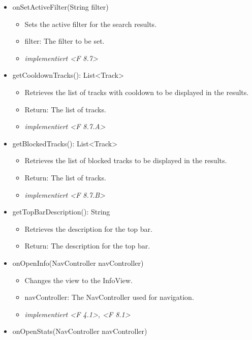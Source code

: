 \documentclass[oneside, ngerman]{sdqtechreport}
\begin{document}
\begin{itemize}
\begin{itemize}
        \end{itemize}
    \item onSetActiveFilter(String filter)
        \begin{itemize}
            \item Sets the active filter for the search results.
            \item filter: The filter to be set.
            \item \textit{implementiert <F 8.7>}
        \end{itemize}
    \item getCooldownTracks(): List<Track>
        \begin{itemize}
            \item Retrieves the list of tracks with cooldown to be displayed in the results.
            \item Return: The list of tracks.
            \item \textit{implementiert <F 8.7.A>}
        \end{itemize}
    \item getBlockedTracks(): List<Track>
        \begin{itemize}
            \item Retrieves the list of blocked tracks to be displayed in the results.
            \item Return: The list of tracks.
            \item \textit{implementiert <F 8.7.B>}
        \end{itemize}
    \item getTopBarDescription(): String
        \begin{itemize}
            \item Retrieves the description for the top bar.
            \item Return: The description for the top bar.
        \end{itemize}
    \item onOpenInfo(NavController navController)
        \begin{itemize}
            \item Changes the view to the InfoView.
            \item navController: The NavController used for navigation.
            \item \textit{implementiert <F 4.1>, <F 8.1>}
        \end{itemize}
    \item onOpenStats(NavController navController)

\end{itemize}
\end{document}
